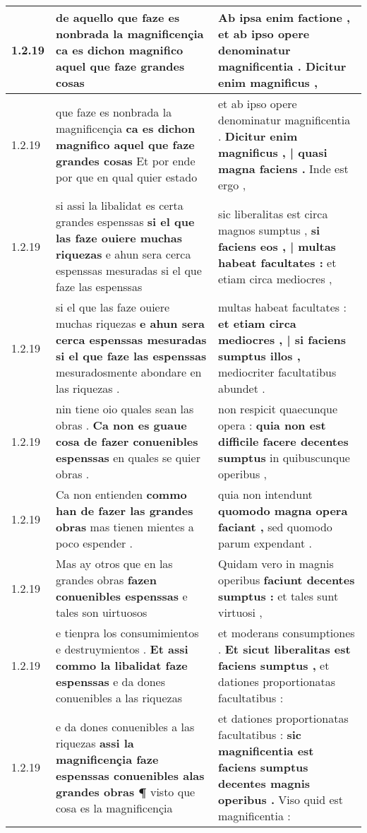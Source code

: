 \begin{tabular}{|p{1cm}|p{6.5cm}|p{6.5cm}|}
1.2.19 & de aquello \textbf{ que faze es nonbrada la magnificençia } ca es dichon magnifico aquel que faze grandes cosas & Ab ipsa enim factione , \textbf{ et ab ipso opere denominatur magnificentia . } Dicitur enim magnificus , \\\hline
1.2.19 & que faze es nonbrada la magnificençia \textbf{ ca es dichon magnifico aquel que faze grandes cosas } Et por ende por que en qual quier estado & et ab ipso opere denominatur magnificentia . \textbf{ Dicitur enim magnificus , | quasi magna faciens . } Inde est ergo , \\\hline
1.2.19 & si assi la libalidat es certa grandes espenssas \textbf{ si el que las faze ouiere muchas riquezas } e ahun sera cerca espenssas mesuradas si el que faze las espenssas & sic liberalitas est circa magnos sumptus , \textbf{ si faciens eos , | multas habeat facultates : } et etiam circa mediocres , \\\hline
1.2.19 & si el que las faze ouiere muchas riquezas \textbf{ e ahun sera cerca espenssas mesuradas si el que faze las espenssas } mesuradosmente abondare en las riquezas . & multas habeat facultates : \textbf{ et etiam circa mediocres , | si faciens sumptus illos , } mediocriter facultatibus abundet . \\\hline
1.2.19 & nin tiene oio quales sean las obras . \textbf{ Ca non es guaue cosa de fazer conuenibles espenssas } en quales se quier obras . & non respicit quaecunque opera : \textbf{ quia non est difficile facere decentes sumptus } in quibuscunque operibus , \\\hline
1.2.19 & Ca non entienden \textbf{ commo han de fazer las grandes obras } mas tienen mientes a poco espender . & quia non intendunt \textbf{ quomodo magna opera faciant , } sed quomodo parum expendant . \\\hline
1.2.19 & Mas ay otros que en las grandes obras \textbf{ fazen conuenibles espenssas } e tales son uirtuosos & Quidam vero in magnis operibus \textbf{ faciunt decentes sumptus : } et tales sunt virtuosi , \\\hline
1.2.19 & e tienpra los consumimientos e destruymientos . \textbf{ Et assi commo la libalidat faze espenssas } e da dones conuenibles a las riquezas & et moderans consumptiones . \textbf{ Et sicut liberalitas est faciens sumptus , } et dationes proportionatas facultatibus : \\\hline
1.2.19 & e da dones conuenibles a las riquezas \textbf{ assi la magnificençia faze espenssas conuenibles alas grandes obras ¶ } visto que cosa es la magnificençia & et dationes proportionatas facultatibus : \textbf{ sic magnificentia est faciens sumptus decentes magnis operibus . } Viso quid est magnificentia : \\\hline

\end{tabular}
